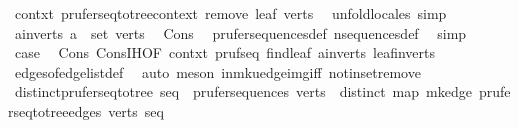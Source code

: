 \begin{isabellebody}
\ contxt{\isacharprime}{\kern0pt}{\isacharcolon}{\kern0pt}\ {\isachardoublequoteopen}prufer{\isacharunderscore}{\kern0pt}seq{\isacharunderscore}{\kern0pt}to{\isacharunderscore}{\kern0pt}tree{\isacharunderscore}{\kern0pt}context\ {\isacharparenleft}{\kern0pt}remove{}\ leaf\ verts{\isacharparenright}{\kern0pt}{\isachardoublequoteclose}\ \isamarkupfalse%
\ {\isacharparenleft}{\kern0pt}unfold{\isacharunderscore}{\kern0pt}locales{\isacharcomma}{\kern0pt}\ simp{\isacharparenright}{\kern0pt}\isanewline
\ \ \isamarkupfalse%
\ a{\isacharunderscore}{\kern0pt}in{\isacharunderscore}{\kern0pt}verts{\isacharcolon}{\kern0pt}\ {\isachardoublequoteopen}a\ {\isasymin}\ set\ verts{\isachardoublequoteclose}\ \isamarkupfalse%
\ Cons{\isacharparenleft}{\kern0pt}{}{\isacharparenright}{\kern0pt}\ \isamarkupfalse%
\ prufer{\isacharunderscore}{\kern0pt}sequences{\isacharunderscore}{\kern0pt}def\ n{\isacharunderscore}{\kern0pt}sequences{\isacharunderscore}{\kern0pt}def\ \isamarkupfalse%
\ simp\isanewline
\ \ \isamarkupfalse%
\ {\isacharquery}{\kern0pt}case\ \isamarkupfalse%
\ Cons{\isacharparenleft}{\kern0pt}{}{\isacharparenright}{\kern0pt}\ Cons{\isachardot}{\kern0pt}IH{\isacharbrackleft}{\kern0pt}OF\ contxt{\isacharprime}{\kern0pt}\ pruf{\isacharunderscore}{\kern0pt}seq{\isacharprime}{\kern0pt}{\isacharbrackright}{\kern0pt}\ find{\isacharunderscore}{\kern0pt}leaf\ a{\isacharunderscore}{\kern0pt}in{\isacharunderscore}{\kern0pt}verts\ leaf{\isacharunderscore}{\kern0pt}in{\isacharunderscore}{\kern0pt}verts\isanewline
\ \ \ \ \isamarkupfalse%
\ edges{\isacharunderscore}{\kern0pt}of{\isacharunderscore}{\kern0pt}edge{\isacharunderscore}{\kern0pt}list{\isacharunderscore}{\kern0pt}def\ \isamarkupfalse%
\ {\isacharparenleft}{\kern0pt}auto{\isacharcomma}{\kern0pt}\ {\isacharparenleft}{\kern0pt}meson\ in{\isacharunderscore}{\kern0pt}mk{\isacharunderscore}{\kern0pt}uedge{\isacharunderscore}{\kern0pt}img{\isacharunderscore}{\kern0pt}iff\ notin{\isacharunderscore}{\kern0pt}set{\isacharunderscore}{\kern0pt}remove{}{\isacharparenright}{\kern0pt}{\isacharplus}{\kern0pt}{\isacharparenright}{\kern0pt}\isanewline
{}\isamarkupfalse%
%
\endisatagproof
{\isafoldproof}%
%
\isadelimproof
\isanewline
%
\endisadelimproof
\isanewline
{}\isamarkupfalse%
\ distinct{\isacharunderscore}{\kern0pt}prufer{\isacharunderscore}{\kern0pt}seq{\isacharunderscore}{\kern0pt}to{\isacharunderscore}{\kern0pt}tree{\isacharcolon}{\kern0pt}\ {\isachardoublequoteopen}seq\ {\isasymin}\ prufer{\isacharunderscore}{\kern0pt}sequences\ verts\ {\isasymLongrightarrow}\ distinct\ {\isacharparenleft}{\kern0pt}map\ mk{\isacharunderscore}{\kern0pt}edge\ {\isacharparenleft}{\kern0pt}prufer{\isacharunderscore}{\kern0pt}seq{\isacharunderscore}{\kern0pt}to{\isacharunderscore}{\kern0pt}tree{\isacharunderscore}{\kern0pt}edges\ verts\ seq{\isacharparenright}{\kern0pt}{\isacharparenright}{\kern0pt}{\isachardoublequoteclose}\isanewline

\end{isabellebody}
